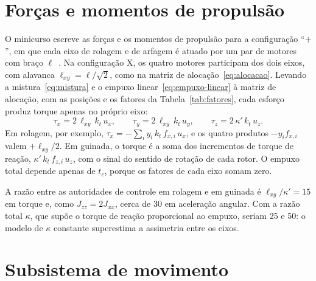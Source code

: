\section{Forças e momentos de propulsão}
\label{sec:forcas-momentos}

O minicurso escreve as forças e os momentos de propulsão para a configuração
``$+$'', em que cada eixo de rolagem e de arfagem é
atuado por um par de motores com braço $\ell$~\cite{fischer2025}. Na
configuração X, os quatro motores participam dos dois eixos, com alavanca
$\ell_{xy} = \ell/\sqrt{2}$, como na matriz de alocação~\eqref{eq:alocacao}.
Levando a mistura~\eqref{eq:mistura} e o empuxo linear~\eqref{eq:empuxo-linear}
à matriz de alocação, com as posições e os fatores da
Tabela~\ref{tab:fatores}, cada esforço produz torque apenas no próprio eixo:
\begin{equation}
\tau_x = 2\,\ell_{xy}\,k_t\,u_x, \qquad
\tau_y = 2\,\ell_{xy}\,k_t\,u_y, \qquad
\tau_z = 2\,\kappa'\,k_t\,u_z.
\label{eq:torques-esforcos}
\end{equation}
Em rolagem, por exemplo, $\tau_x = -\sum_i y_i\,k_t\,f_{x,i}\,u_x$, e os
quatro produtos $-y_i f_{x,i}$ valem $+\ell_{xy}/2$. Em guinada, o torque é
a soma dos incrementos de torque de reação, $\kappa'\,k_t\,f_{z,i}\,u_z$, com
o sinal do sentido de rotação de cada rotor. O empuxo total depende apenas de
$t_c$, porque os fatores de cada eixo somam zero.

A razão entre as autoridades de controle em rolagem e em guinada é
$\ell_{xy}/\kappa' = 15$ em torque e, como $J_{zz} = 2J_{xx}$, cerca de 30 em
aceleração angular. Com a razão total $\kappa$, que supõe o torque de reação
proporcional ao empuxo, seriam 25 e 50: o modelo de $\kappa$ constante
superestima a assimetria entre os eixos.

\section{Subsistema de movimento}
\label{sec:movimento}

